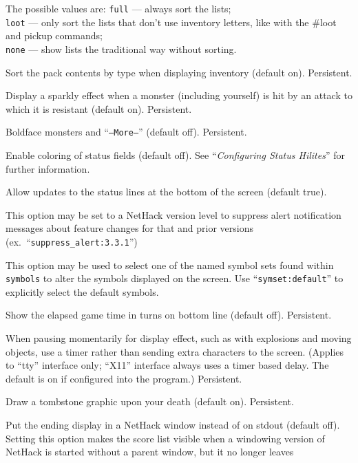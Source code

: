 The possible values are:
{\tt full} --- always sort the lists;\\
{\tt loot} --- only sort the lists that don't use inventory
       letters, like with the \#loot and pickup commands;\\
{\tt none} --- show lists the traditional way without sorting.
\item[\ib{sortpack}]
Sort the pack contents by type when displaying inventory (default on).
Persistent.
\item[\ib{sparkle}]
Display a sparkly effect when a monster (including yourself) is hit by an
attack to which it is resistant (default on).  Persistent.
\item[\ib{standout}]
Boldface monsters and ``{\tt --More--}'' (default off).  Persistent.
\item[\ib{statushilites}]
Enable coloring of status fields (default off).
See ``{\it Configuring Status Hilites\/}'' for further information.
\item[\ib{status\verb+_+updates}]
Allow updates to the status lines at the bottom of the screen (default true).
\item[\ib{suppress\verb+_+alert}]
This option may be set to a NetHack version level to suppress
alert notification messages about feature changes for that 
and prior versions (ex.\ ``{\tt suppress\verb+_+alert:3.3.1}'')
\item[\ib{symset}]
This option may be used to select one of the named symbol sets found within
{\tt symbols} to alter the symbols displayed on the screen.
Use ``{\tt symset:default}'' to explicitly select the default symbols.
\item[\ib{time}]
Show the elapsed game time in turns on bottom line (default off).  Persistent.
\item[\ib{timed\verb+_+delay}]
When pausing momentarily for display effect, such as with explosions and
moving objects, use a timer rather than sending extra characters to the
screen.  (Applies to ``tty'' interface only; ``X11'' interface always
uses a timer based delay.  The default is on if configured into the
program.)  Persistent.
\item[\ib{tombstone}]
Draw a tombstone graphic upon your death (default on).  Persistent.
\item[\ib{toptenwin}]
Put the ending display in a NetHack window instead of on stdout (default off).
Setting this option makes the score list visible when a windowing version
of NetHack is started without a parent window, but it no longer leaves
